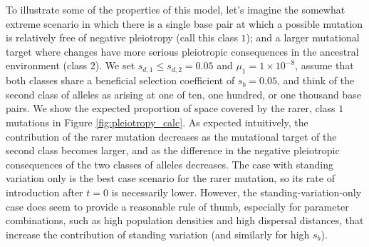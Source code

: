 \documentclass{article}
\begin{document}
To illustrate some of the properties of this model, 
let's imagine the somewhat extreme scenario in which there is a single base pair 
at which a possible mutation is relatively free of negative pleiotropy (call this class $1$);
and a larger mutational target where changes 
have more serious pleiotropic consequences in the ancestral environment (class $2$). 
We set $s_{d,1} \leq s_{d,2}=0.05$ and $\mu_1=1 \times 10^{-8}$, 
assume that both classes share a beneficial selection coefficient of $s_b=0.05$,
and think of the second class of alleles as arising at one of ten, one hundred, or one thousand base pairs. 
We show the expected proportion of space covered by
the rarer, class $1$ mutations in Figure \ref{fig:pleiotropy_calc}.
As expected intuitively, the contribution of the rarer mutation decreases as the
mutational target of the second class becomes larger, and as the
difference in the negative pleiotropic consequences of the two classes of alleles decreases. 
The case with standing variation only is the best case scenario 
for the rarer mutation, so its rate of introduction after $t=0$ is necessarily lower. 
However, the standing-variation-only case does seem to provide a
reasonable rule of thumb, especially for parameter combinations, 
such as high population densities and high dispersal distances, 
that increase the contribution of standing variation (and similarly for high $s_b$). 
\end{document}
